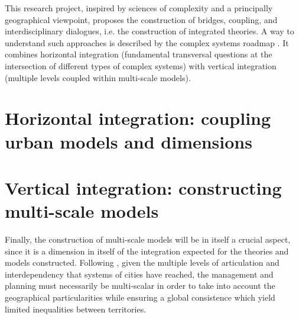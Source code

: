 This research project, inspired by sciences of complexity and a principally geographical viewpoint, proposes the construction of bridges, coupling, and interdisciplinary dialogues, i.e. the construction of integrated theories. A way to understand such approaches is described by the complex systems roadmap \cite{bourgine2009french}. It combines horizontal integration (fundamental transversal questions at the intersection of different types of complex systems) with vertical integration (multiple levels coupled within multi-scale models). 





\section{Horizontal integration: coupling urban models and dimensions}





\section{Vertical integration: constructing multi-scale models}


Finally, the construction of multi-scale models will be in itself a crucial aspect, since it is a dimension in itself of the integration expected for the theories and models constructed. Following \cite{rozenblat2018conclusion}, given the multiple levels of articulation and interdependency that systems of cities have reached, the management and planning must necessarily be multi-scalar in order to take into account the geographical particularities while ensuring a global consistence which yield limited inequalities between territories.


